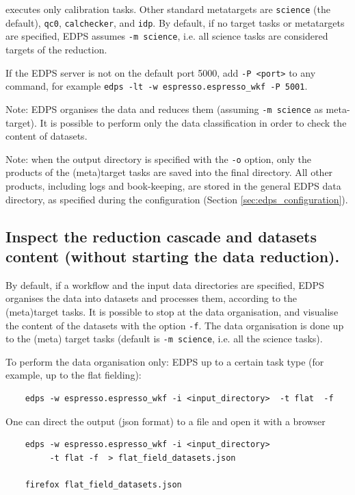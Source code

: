 executes only calibration tasks. Other standard metatargets are {\tt science} (the default), {\tt qc0}, {\tt calchecker}, and {\tt idp}. By default, if no target tasks or metatargets are specified, EDPS assumes {\tt -m science}, i.e. all science tasks are considered targets of the reduction.

If the EDPS server is not on the default port 5000, add {\tt -P <port>} to any command, for example {\tt edps -lt -w espresso.espresso\_wkf -P 5001}.

Note: EDPS organises the data and reduces them (assuming {\tt -m science} as meta-target). It is possible to perform only the data classification in order to check the content of datasets.

Note: when the output directory is specified with the {\tt -o} option, only the products of the (meta)target tasks are saved into the final directory. All other products, including logs and book-keeping, are stored in the general EDPS data directory, as specified during the configuration (Section \ref{sec:edps_configuration}).

\subsection{Inspect the reduction cascade and datasets content (without starting the data reduction).}
\label{sec:edps_cascade}

By default,  if a workflow and the input data directories are specified, EDPS organises the data into datasets and processes them, according to the (meta)target tasks. It is possible to stop at the data organisation, and visualise the content of the datasets with the option {\tt -f}. The data organisation is done up to the (meta) target tasks (default is {\tt -m science}, i.e. all the science tasks).

To perform the data organisation only: EDPS up to a certain task type (for example, up to the flat fielding):
 
\begin{verbatim}
    edps -w espresso.espresso_wkf -i <input_directory>  -t flat  -f 
\end{verbatim}
One can direct the output (json format) to a file and open it with a browser
\begin{verbatim}
    edps -w espresso.espresso_wkf -i <input_directory> 
         -t flat -f  > flat_field_datasets.json
         
    firefox flat_field_datasets.json
\end{verbatim}

